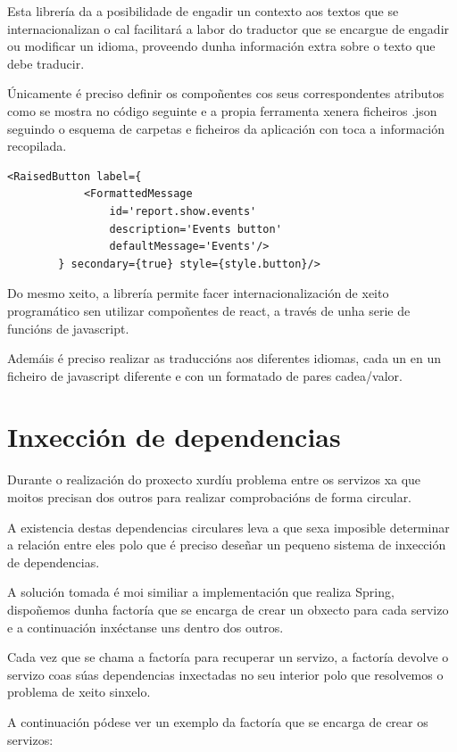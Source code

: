  Esta librería da a posibilidade de engadir un contexto aos textos que se 
internacionalizan o cal facilitará a labor do traductor que se encargue de 
engadir ou modificar un idioma, proveendo dunha información extra sobre o texto 
que debe traducir.

  Únicamente é preciso definir os compoñentes cos seus correspondentes 
atributos como se mostra no código seguinte e a propia ferramenta xenera 
ficheiros .json seguindo o esquema de carpetas e ficheiros da aplicación con 
toca a información recopilada.

     \begin{lstlisting}[caption=Exemplo de internacionalización na label de un 
botón.]
        <RaisedButton label={
            <FormattedMessage
                id='report.show.events'
                description='Events button'
                defaultMessage='Events'/>
        } secondary={true} style={style.button}/>
    \end{lstlisting}

  Do mesmo xeito, a librería permite facer internacionalización de xeito 
programático sen utilizar compoñentes de react, a través de unha serie de 
funcións de javascript.

  Ademáis é preciso realizar as traduccións aos diferentes idiomas, cada un 
en un ficheiro de javascript diferente e con un formatado de pares cadea/valor.

  \section{Inxección de dependencias}
  Durante o realización do proxecto xurdíu problema entre os servizos xa que 
moitos precisan dos outros para realizar comprobacións de forma circular.

  A existencia destas dependencias circulares leva a que sexa imposible 
determinar a relación entre eles polo que é preciso deseñar un pequeno sistema 
de inxección de dependencias.

  A solución tomada é moi similiar a implementación que realiza Spring, 
dispoñemos dunha factoría que se encarga de crear un obxecto para cada servizo 
e a continuación inxéctanse uns dentro dos outros.

  Cada vez que se chama a factoría para recuperar un servizo, a factoría 
devolve o servizo coas súas dependencias inxectadas no seu interior polo que 
resolvemos o problema de xeito sinxelo.

  A continuación pódese ver un exemplo da factoría que se encarga de crear os 
servizos:

